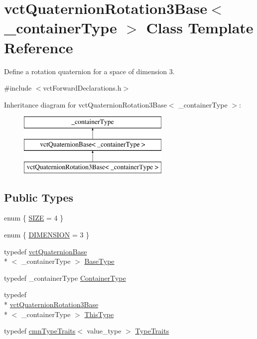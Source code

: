 \hypertarget{classvct_quaternion_rotation3_base}{\section{vct\-Quaternion\-Rotation3\-Base$<$ \-\_\-container\-Type $>$ Class Template Reference}
\label{classvct_quaternion_rotation3_base}
}


Define a rotation quaternion for a space of dimension 3.  




{\ttfamily \#include $<$vct\-Forward\-Declarations.\-h$>$}

Inheritance diagram for vct\-Quaternion\-Rotation3\-Base$<$ \-\_\-container\-Type $>$\-:\begin{figure}[H]
\begin{center}
\leavevmode
\includegraphics[height=3.000000cm]{db/d76/classvct_quaternion_rotation3_base}
\end{center}
\end{figure}
\subsection*{Public Types}
\begin{DoxyCompactItemize}
\item 
enum \{ \hyperlink{classvct_quaternion_rotation3_base_a6baf2fda4760908cbc94c53f79838804a42527344f7f8ba3f199c418756497bc1}{S\-I\-Z\-E} = 4
 \}
\item 
enum \{ \hyperlink{classvct_quaternion_rotation3_base_a729ac03acdd5949ecf382629e563d2a0a9417132a8a6849e18439d903ae6a1f18}{D\-I\-M\-E\-N\-S\-I\-O\-N} = 3
 \}
\item 
typedef \hyperlink{classvct_quaternion_base}{vct\-Quaternion\-Base}\\*
$<$ \-\_\-container\-Type $>$ \hyperlink{classvct_quaternion_rotation3_base_aec53a8354bebb034598fe2b02ffc8217}{Base\-Type}
\item 
typedef \-\_\-container\-Type \hyperlink{classvct_quaternion_rotation3_base_a41c3b08279a5560f43351c14666c9c6a}{Container\-Type}
\item 
typedef \\*
\hyperlink{classvct_quaternion_rotation3_base}{vct\-Quaternion\-Rotation3\-Base}\\*
$<$ \-\_\-container\-Type $>$ \hyperlink{classvct_quaternion_rotation3_base_aff1feb6ba01e2cbc6f455a140992e728}{This\-Type}
\item 
typedef \hyperlink{classcmn_type_traits}{cmn\-Type\-Traits}$<$ value\-\_\-type $>$ \hyperlink{classvct_quaternion_rotation3_base_a78f36636344dd97b9837f9b15aedd1f7}{Type\-Traits}
\end{DoxyCompactItemize}
